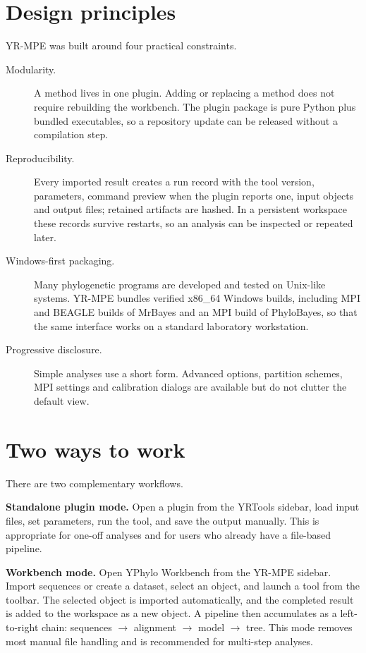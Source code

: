 \documentclass[10pt]{report}
\begin{document}
\section{Design principles}

YR-MPE was built around four practical constraints.

\begin{description}
  \item[Modularity.] A method lives in one plugin. Adding or replacing a method
        does not require rebuilding the workbench. The plugin package is pure
        Python plus bundled executables, so a repository update can be
        released without a compilation step.
  \item[Reproducibility.] Every imported result creates a run record with the
        tool version, parameters, command preview when the plugin reports one,
        input objects and output files; retained artifacts are hashed. In a
        persistent workspace these records survive restarts, so an analysis
        can be inspected or repeated later.
  \item[Windows-first packaging.] Many phylogenetic programs are developed and
        tested on Unix-like systems. YR-MPE bundles verified x86\_64 Windows
        builds, including MPI and BEAGLE builds of MrBayes and an MPI build of
        PhyloBayes, so that the same interface works on a standard laboratory
        workstation.
  \item[Progressive disclosure.] Simple analyses use a short form. Advanced
        options, partition schemes, MPI settings and calibration dialogs are
        available but do not clutter the default view.
\end{description}

\section{Two ways to work}

There are two complementary workflows.

\textbf{Standalone plugin mode.} Open a plugin from the YRTools sidebar, load
input files, set parameters, run the tool, and save the output manually. This
is appropriate for one-off analyses and for users who already have a file-based
pipeline.

\textbf{Workbench mode.} Open YPhylo Workbench from the YR-MPE sidebar. Import
sequences or create a dataset, select an object, and launch a tool from the
toolbar. The selected object is imported automatically, and the completed
result is added to the workspace as a new object. A pipeline then accumulates
as a left-to-right chain: sequences $\rightarrow$ alignment $\rightarrow$
model $\rightarrow$ tree. This mode removes most manual file handling and is
recommended for multi-step analyses.
\end{document}
